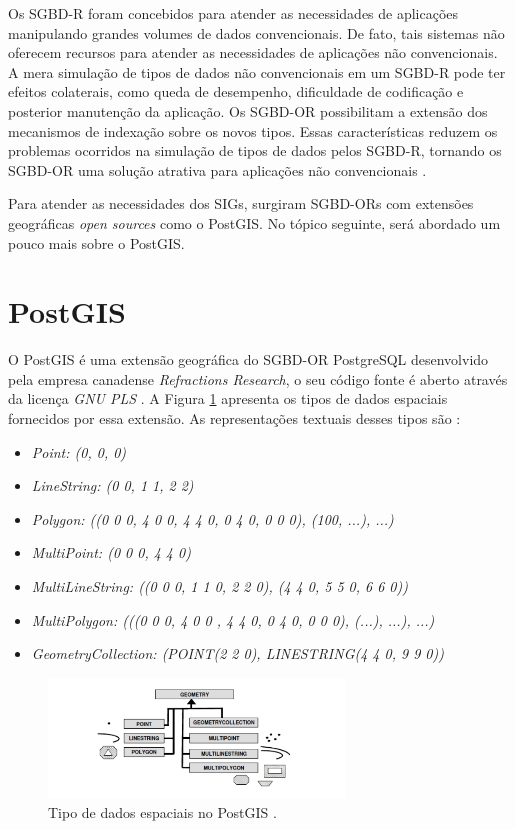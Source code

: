Os SGBD-R foram concebidos para atender as necessidades de aplicações manipulando grandes volumes de dados convencionais. De fato, tais sistemas não oferecem recursos para atender as necessidades de aplicações não convencionais. A mera simulação de tipos de dados não convencionais em um SGBD-R pode ter efeitos colaterais, como queda de desempenho, dificuldade de codificação e posterior manutenção da aplicação. Os SGBD-OR possibilitam a extensão dos mecanismos de indexação sobre os novos tipos. Essas características reduzem os problemas ocorridos na simulação de tipos de dados pelos SGBD-R, tornando os SGBD-OR uma solução atrativa para aplicações não convencionais \cite{queirozferreira}.

Para atender as necessidades dos SIGs, surgiram SGBD-ORs com extensões geográficas \textit{open sources} como o PostGIS. No tópico seguinte, será abordado um pouco mais sobre o PostGIS.

\newpage

\section{PostGIS}

O PostGIS é uma extensão geográfica do SGBD-OR PostgreSQL desenvolvido pela empresa canadense \textit{Refractions Research}, o seu código fonte é aberto através da licença \textit{GNU PLS} \cite{PostGIS}. A Figura \ref{fig:DadosPostGIS} apresenta os tipos de dados espaciais fornecidos por essa extensão. As representações textuais desses tipos são \cite{queirozferreira}:

\begin{itemize}
\item \textit{Point: (0, 0, 0)}
\item \textit{LineString: (0 0, 1 1, 2 2)}
\item \textit{Polygon: ((0 0 0, 4 0 0, 4 4 0, 0 4 0, 0 0 0), (100, ...), ...)}
\item \textit{MultiPoint: (0 0 0, 4 4 0)}
\item \textit{MultiLineString: ((0 0 0, 1 1 0, 2 2 0), (4 4 0, 5 5 0, 6 6 0))}
\item \textit{MultiPolygon: (((0 0 0, 4 0 0 , 4 4 0, 0 4 0, 0 0 0), (...), ...), ...)}
\item \textit{GeometryCollection: (POINT(2 2 0), LINESTRING(4 4 0, 9 9 0))}
\end{itemize}

\begin{figure}[h]
\centering
\includegraphics[width=0.70\textwidth]{./img/cap_II/11-DadosPostGIS}
\caption{Tipo de dados espaciais no PostGIS \cite{queirozferreira}.}
\label{fig:DadosPostGIS}
\end{figure}

